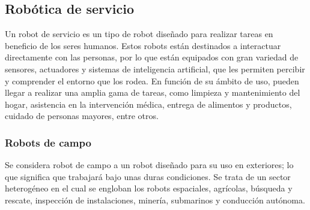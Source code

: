 \subsection{Robótica de servicio}
Un robot de servicio es un tipo de robot diseñado para realizar tareas en beneficio de los seres humanos. Estos robots están 
destinados a interactuar directamente con las personas, por lo que están equipados con gran variedad de sensores, actuadores y sistemas de 
inteligencia artificial, que les permiten percibir y comprender el entorno que los rodea. 
En función de su ámbito de uso, pueden llegar a realizar una amplia gama de tareas, como limpieza y mantenimiento del hogar, 
asistencia en la intervención médica, entrega de alimentos y productos, cuidado de personas mayores, entre otros.

\subsubsection{Robots de campo}
Se considera robot de campo a un robot diseñado para su uso en exteriores; lo que significa que trabajará bajo unas duras condiciones. 
Se trata de un sector heterogéneo en el cual se engloban los 
robots espaciales, agrícolas, búsqueda y rescate, inspección de instalaciones, minería, submarinos y conducción autónoma.
